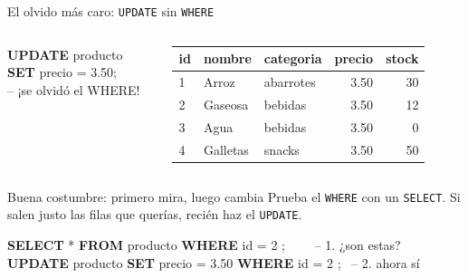 \documentclass[aspectratio=169,10pt,c]{beamer}
\newcommand{\kw}[1]{\textcolor{utpRojo}{\textbf{#1}}}
\newcommand{\nuevo}[1]{{%
  \setlength{\fboxsep}{1.2pt}%
  \begingroup
  \renewcommand{\kw}[1]{\textcolor{utpNegro}{\textbf{##1}}}%
  \colorbox{yellow!45}{\textcolor{utpNegro}{#1}}%
  \endgroup}}
\newcommand{\com}[1]{\textcolor{utpGris}{-- #1}}
\newcommand{\mal}[1]{{\setlength{\fboxsep}{1.2pt}\colorbox{utpRojo!18}{#1}}}
\newenvironment{sqlcode}[1][.86\textwidth]
  {\begin{center}\begin{lrbox}{\sqlbuf}\begin{minipage}{#1}\ttfamily\footnotesize\vspace{6pt}\raggedright}
  {\vspace{6pt}\end{minipage}\end{lrbox}\colorbox{utpGrisClaro}{\usebox{\sqlbuf}}\end{center}}
\newcommand{\cabproducto}{%
  \normalfont\bfseries id & \normalfont\bfseries nombre & \normalfont\bfseries categoria
  & \normalfont\bfseries precio & \normalfont\bfseries stock \\}
\begin{document}
\begin{frame}{El olvido más caro: \texttt{UPDATE} sin \texttt{WHERE}}
\begin{columns}[c,onlytextwidth]
\begin{sqlcode}[\textwidth]
\kw{UPDATE} producto \kw{SET} precio = 3.50;\\
\com{¡se olvidó el WHERE!}
\end{sqlcode}
\centering\scriptsize\ttfamily
\begin{tabular}{lllrr}
\toprule
\cabproducto
\midrule
1 & Arroz & abarrotes & \mal{3.50} & 30 \\
2 & Gaseosa & bebidas & \mal{3.50} & 12 \\
3 & Agua & bebidas & \mal{3.50} & 0 \\
4 & Galletas & snacks & \mal{3.50} & 50 \\
\bottomrule
\end{tabular}
\end{columns}
\vspace{0.2cm}
\vspace{0.15cm}
\begin{block}{Buena costumbre: primero mira, luego cambia}
\small Prueba el \texttt{WHERE} con un \texttt{SELECT}. Si salen justo las filas que querías, recién haz el \texttt{UPDATE}.
\begin{sqlcode}[.92\textwidth]
\scriptsize
\kw{SELECT} * \kw{FROM} producto \nuevo{\kw{WHERE} id = 2}; \ \ \ \ \com{1. ¿son estas?}\\
\kw{UPDATE} producto \kw{SET} precio = 3.50 \nuevo{\kw{WHERE} id = 2}; \ \com{2. ahora sí}
\end{sqlcode}
\end{block}
\end{frame}
\end{document}
